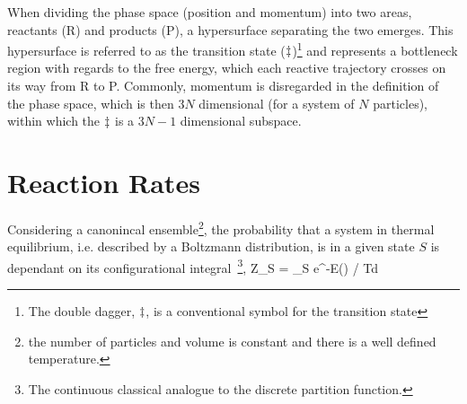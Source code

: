 When dividing the phase space (position and momentum) into two areas, reactants (R) and products (P), a hypersurface separating the two emerges.
This hypersurface is referred to as the transition state ($\ddagger$)\footnote{The double dagger, $\ddagger$, is a conventional symbol for the transition state} and represents a bottleneck region with regards to the free energy, which each reactive trajectory crosses on its way from R to P.
Commonly, momentum is disregarded in the definition of the phase space, which is then $3N$ dimensional (for a system of $N$ particles), within which the $\ddagger$ is a $3N-1$ dimensional subspace.







\section{Reaction Rates}
Considering a canonincal ensemble\footnote{the number of particles and volume is constant and there is a well defined temperature.}, the probability that a system in thermal equilibrium, i.e. described by a Boltzmann distribution, is in a given state $S$ is dependant on its configurational integral~\footnote{The continuous classical analogue to the discrete partition function.},
Z_S = \int_S e^{-E(\vR) / \kB T}d\vR
\eeq


